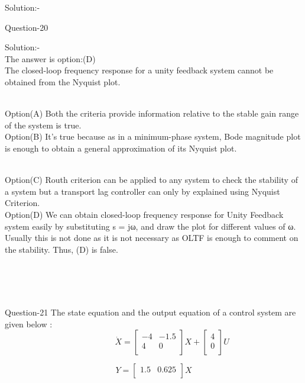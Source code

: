 \documentclass[journal,12pt,twocolumn]{IEEEtran}
\begin{document}
\begin{frame}{Solution:- }
\begin{frame}{}
\begin{frame}{Question-20 }
\end{frame}
\begin{frame}{Solution:- }
\\
     The answer is option:(D)
\\ The closed-loop frequency response for a unity feedback system cannot be obtained from the Nyquist plot. 

\end{frame}

\begin{frame}{}
\\
 Option(A) Both the criteria provide information relative to the stable gain range of the system is true.
\\ Option(B) It's true because as in a minimum-phase system, Bode magnitude plot is enough to obtain a general
approximation of its Nyquist plot.

\end{frame}

\begin{frame}{}
\\    
     Option(C)  Routh criterion can be applied to any system to check the stability of a system but a transport lag
controller can only by explained using Nyquist Criterion.
\\
 Option(D)  We can obtain closed-loop frequency response for Unity Feedback system easily by substituting s
= jω, and draw the plot for different values of ω. Usually this is not done as it is not necessary as
OLTF is enough to comment on the stability. Thus, (D) is false.
\\   
\end{frame}
\\\\\\
\begin{frame}{Question-21 }
 The state equation and the output equation of a control system are given below :   
    \[\;\;\;\;\;\;\;\;\;\;\;\;\;\;\;\;\dot{X} =
  \left[ {\begin{array}{cc}
   -4 & -1.5 \\
   4 & 0 \\
  \end{array} }\right] X +
  \left[ {\begin{array}{cc}
  
      4   \\
      0 \\
  \end{array} }\right] U\]
  
    \[Y = 
 \left[ {\begin{array}{cc}
   1.5 & 0.625 \\
  \end{array} }\right] X \]
   

\end{frame}
\end{frame}
\end{frame}
\end{document}
